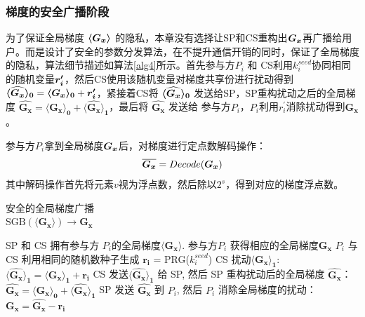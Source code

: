 \subsubsection{梯度的安全广播阶段}\label{distribution} 
为了保证全局梯度 $\svec{G_x}$ 的隐私，本章没有选择让SP和CS重构出$\bs{G_x}$再广播给用户。而是设计了安全的参数分发算法，在不提升通信开销的同时，保证了全局梯度的隐私，算法细节描述如算法\ref{alg4}所示。首先参与方$P_i$ 和 CS利用$k_i^{seed}$协同相同的随机变量$\bs{r_i^{\prime}}$，然后CS使用该随机变量对梯度共享份进行扰动得到 $\svec[0]{\widehat{G_x}} = \svec[0]{G_x} + \bs{r_i^{\prime}}$，紧接着CS将 $\svec[0]{\widehat{G_x}}$ 发送给SP，SP重构扰动之后的全局梯度 $\boldsymbol{\widehat{G_x}} = \boldsymbol{\langle G_x\rangle_0} + \boldsymbol{\langle \widehat{G_x}\rangle_1}$，最后将 $\boldsymbol{\widehat{G_x}}$ 发送给 参与方$P_i$，$P_i$利用$r_i^{\prime}$消除扰动得到$\boldsymbol{G_x}$。

参与方$P_i$拿到全局梯度$\bs{G_x}$后，对梯度进行定点数解码操作：
\begin{equation}
	\bs{\overline{G_x}} = Decode(\bs{G_x})
\end{equation}
其中解码操作首先将元素$v$视为浮点数，然后除以$2^s$，得到对应的梯度浮点数。

\begin{algorithm}[htbp]
	\caption{安全的全局梯度广播 \\$\text{SGB}(\boldsymbol{\langle G_x\rangle}) \rightarrow \boldsymbol{G_x}$}
	\label{alg4}
	\begin{algorithmic}[1]
		\REQUIRE SP 和 CS 拥有参与方 $P_i$的全局梯度$\boldsymbol{\langle G_x\rangle}$.
		\ENSURE 参与方$P_i$ 获得相应的全局梯度$\boldsymbol{G_x}$
		\STATE $P_i$ 与 CS 利用相同的随机数种子生成 $\boldsymbol{r_i}$ = PRG($k_i^{seed}$) 
		\STATE CS 扰动$\boldsymbol{\langle G_x\rangle_1}$:\\ $\boldsymbol{\langle \widehat{G_x}\rangle_1} = \boldsymbol{\langle G_x\rangle_1} + \boldsymbol{r_i}$
		\STATE CS 发送$\boldsymbol{\langle \widehat{G_x}\rangle_1}$ 给 SP, 然后 SP 重构扰动后的全局梯度 $\boldsymbol{\widehat{G_x}}$：\\ $\boldsymbol{\widehat{G_x}} = \boldsymbol{\langle G_x\rangle_0} + \boldsymbol{\langle \widehat{G_x}\rangle_1}$
		\STATE SP 发送 $\boldsymbol{\widehat{G_x}}$ 到 $P_i$, 然后 $P_i$ 消除全局梯度的扰动：\\$\boldsymbol{G_x} = \boldsymbol{\widehat{G_x}} - \boldsymbol{r_i}$
	\end{algorithmic}
\end{algorithm}

